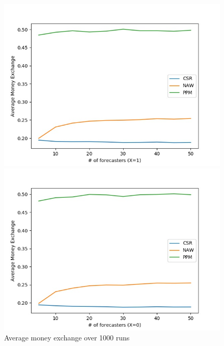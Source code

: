 \documentclass[english,10pt]{article}
\begin{document}
\begin{enumerate}
\begin{enumerate}
        	\begin{figure}[H]
        	\centering
        	\begin{minipage}{0.48\textwidth}
        	\includegraphics[width = \textwidth]{(Beta_0dot3_0dot3)Avg_MnEx(X=1).jpg}
        	\end{minipage}
        	\begin{minipage}{0.48\textwidth}
        	\includegraphics[width = \textwidth]{(Beta_0dot3_0dot3)Avg_MnEx(X=0).jpg}
        	\end{minipage}
        	\caption{Average money exchange over 1000 runs}
        	\end{figure}
        	

\end{enumerate}
\end{enumerate}
\end{document}

